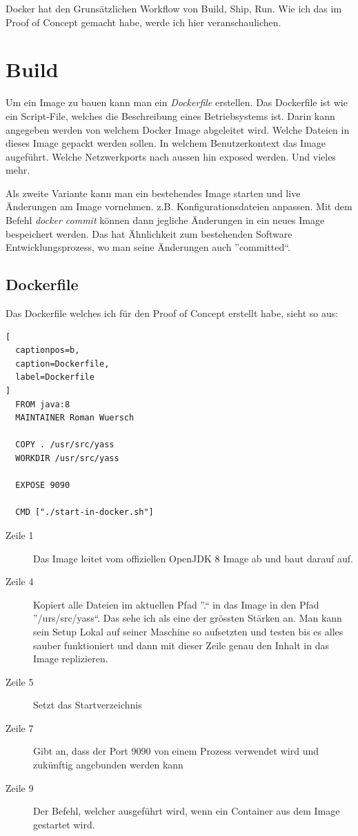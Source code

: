 Docker hat den Grunsätzlichen Workflow von Build, Ship, Run. Wie ich das im Proof of Concept
gemacht habe, werde ich hier veranschaulichen.

\section{Build}

Um ein Image zu bauen kann man ein \textit{Dockerfile} erstellen. Das Dockerfile ist wie ein
Script-File, welches die Beschreibung eines Betriebsystems ist. Darin kann angegeben werden
von welchem Docker Image abgeleitet wird. Welche Dateien in dieses Image gepackt werden sollen.
In welchem Benutzerkontext das Image augeführt. Welche Netzwerkports nach aussen hin exposed werden.
Und vieles mehr.

Als zweite Variante kann man ein bestehendes Image starten und live Änderungen am Image vornehmen.
z.B. Konfigurationsdateien anpassen. Mit dem Befehl \textit{docker commit} können dann jegliche
Änderungen in ein neues Image bespeichert werden. Das hat Ähnlichkeit zum bestehenden
Software Entwicklungsprozess, wo man seine Änderungen auch ”committed“.

\subsection{Dockerfile}

Das Dockerfile welches ich für den Proof of Concept erstellt habe, sieht so aus:

\begin{lstlisting}[
  captionpos=b,
  caption=Dockerfile,
  label=Dockerfile
]
  FROM java:8
  MAINTAINER Roman Wuersch

  COPY . /usr/src/yass
  WORKDIR /usr/src/yass

  EXPOSE 9090

  CMD ["./start-in-docker.sh"]
\end{lstlisting}

\begin{description}

\item[Zeile 1] Das Image leitet vom offiziellen OpenJDK 8 Image ab und baut darauf auf.

\item[Zeile 4] Kopiert alle Dateien im aktuellen Pfad ”.“ in das Image in den Pfad ”/urs/src/yass“. Das
sehe ich als eine der grössten Stärken an. Man kann sein Setup Lokal auf seiner Maschine so aufsetzten und testen
bis es alles sauber funktioniert und dann mit dieser Zeile genau den Inhalt in das Image replizieren.

\item[Zeile 5] Setzt das Startverzeichnis

\item[Zeile 7] Gibt an, dass der Port 9090 von einem Prozess verwendet wird und zukünftig angebunden werden kann

\item[Zeile 9] Der Befehl, welcher ausgeführt wird, wenn ein Container aus dem Image gestartet wird.

\end{description}

